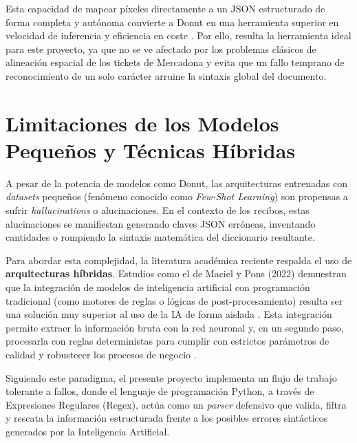 Esta capacidad de mapear píxeles directamente a un JSON estructurado de forma completa y autónoma convierte a Donut en una herramienta superior en velocidad de inferencia y eficiencia en coste \parencite{kim2021donut}. Por ello, resulta la herramienta ideal para este proyecto, ya que no se ve afectado por los problemas clásicos de alineación espacial de los tickets de Mercadona y evita que un fallo temprano de reconocimiento de un solo carácter arruine la sintaxis global del documento.


\section{Limitaciones de los Modelos Pequeños y Técnicas Híbridas}
A pesar de la potencia de modelos como Donut, las arquitecturas entrenadas con \textit{datasets} pequeños (fenómeno conocido como \textit{Few-Shot Learning}) son propensas a sufrir \textit{hallucinations} o alucinaciones. En el contexto de los recibos, estas alucinaciones se manifiestan generando claves JSON erróneas, inventando cantidades o rompiendo la sintaxis matemática del diccionario resultante.

Para abordar esta complejidad, la literatura académica reciente respalda el uso de \textbf{arquitecturas híbridas}. Estudios como el de Maciel y Pons (2022) demuestran que la integración de modelos de inteligencia artificial con programación tradicional (como motores de reglas o lógicas de post-procesamiento) resulta ser una solución muy superior al uso de la IA de forma aislada \parencite{maciel2022extraccion}. Esta integración permite extraer la información bruta con la red neuronal y, en un segundo paso, procesarla con reglas deterministas para cumplir con estrictos parámetros de calidad y robustecer los procesos de negocio \parencite{maciel2022extraccion}.

Siguiendo este paradigma, el presente proyecto implementa un flujo de trabajo tolerante a fallos, donde el lenguaje de programación Python, a través de Expresiones Regulares (Regex), actúa como un \textit{parser} defensivo que valida, filtra y rescata la información estructurada frente a los posibles errores sintácticos generados por la Inteligencia Artificial.